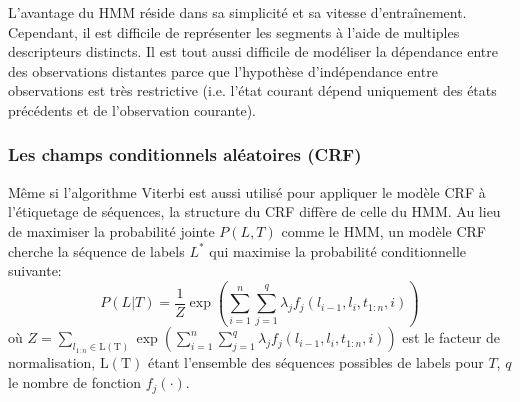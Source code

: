 L'avantage du HMM réside dans sa simplicité et sa vitesse d'entraînement. Cependant, il est difficile de représenter les segments à l'aide de multiples descripteurs distincts. Il est tout aussi difficile de modéliser la dépendance entre des observations distantes parce que l'hypothèse d'indépendance entre observations est très restrictive (i.e. l'état courant dépend uniquement des états précédents et de l'observation courante).

\subsubsection{Les champs conditionnels aléatoires (CRF)}
\label{sec:structuration:litérature-CRF}

Même si l'algorithme Viterbi est aussi utilisé pour appliquer le modèle CRF à l'étiquetage de séquences, la structure du CRF diffère de celle du HMM. Au lieu de maximiser la probabilité jointe $ P(L, T)$ comme le HMM, un modèle CRF \citep{lafferty2001crfie} cherche la séquence de labels $L^*$ qui maximise la probabilité conditionnelle suivante: \[P(L|T) = \frac{1}{Z}\exp \left(\sum\limits_{i=1}^n\sum\limits_{j=1}^q \lambda_j f_j(l_{i-1},l_i,t_{1:n},i)\right)\] où $Z = \sum\limits_{l_{1:n} \in \mathrm{L(T)}}\exp \left(\sum\limits_{i=1}^n\sum\limits_{j=1}^q \lambda_j f_j(l_{i-1},l_i,t_{1:n},i)\right)$ est le facteur de normalisation, $\mathrm{L(T)}$ étant l'ensemble des séquences possibles de labels pour $T$, $q$ le nombre de fonction $f_j(\cdot)$.


